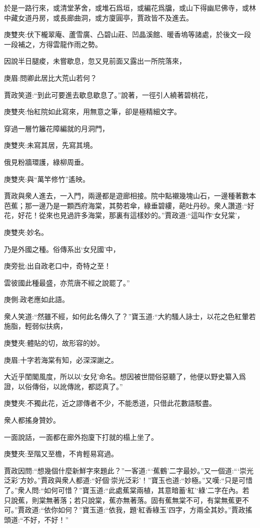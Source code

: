 \begin{parag}
    於是一路行來，或清堂茅舍，或堆石爲垣，或編花爲牖，或山下得幽尼佛寺，或林中藏女道丹房，或長廊曲洞，或方廈圓亭，賈政皆不及進去。\begin{note}庚雙夾:伏下櫳翠庵、蘆雪廣、凸碧山莊、凹晶溪館、暖香塢等諸處，於後文一段一段補之，方得雲龍作雨之勢。\end{note}因說半日腿痠，未嘗歇息，忽又見前面又露出一所院落來，\begin{note}庚眉:問卿此居比大荒山若何？\end{note}賈政笑道:“到此可要進去歇息歇息了。”說著，一徑引人繞著碧桃花，\begin{note}庚雙夾:怡紅院如此寫來，用無意之筆，卻是極精細文字。\end{note}穿過一層竹籬花障編就的月洞門，\begin{note}庚雙夾:未寫其居，先寫其境。\end{note}俄見粉牆環護，綠柳周垂。\begin{note}庚雙夾:與“萬竿修竹”遙映。\end{note}賈政與衆人進去，一入門，兩邊都是遊廊相接。院中點襯幾塊山石，一邊種著數本芭蕉；那一邊乃是一顆西府海棠，其勢若傘，綠垂碧縷，葩吐丹砂。衆人讚道:“好花，好花！從來也見過許多海棠，那裏有這樣妙的。”賈政道:“這叫作‘女兒棠’，\begin{note}庚雙夾:妙名。\end{note}乃是外國之種。俗傳系出‘女兒國’中，\begin{note}庚旁批:出自政老口中，奇特之至！\end{note}雲彼國此種最盛，亦荒唐不經之說罷了。”\begin{note}庚側:政老應如此語。\end{note}衆人笑道:“然雖不經，如何此名傳久了？”寶玉道:“大約騷人詠士，以花之色紅暈若施脂，輕弱似扶病，\begin{note}庚雙夾:體貼的切，故形容的妙。\end{note}\begin{note}庚眉:十字若海棠有知，必深深謝之。\end{note}大近乎閨閣風度，所以以‘女兒’命名。想因被世間俗惡聽了，他便以野史纂入爲證，以俗傳俗，以訛傳訛，都認真了。”\begin{note}庚雙夾:不獨此花，近之謬傳者不少，不能悉道，只借此花數語駁盡。\end{note}衆人都搖身贊妙。
\end{parag}


\begin{parag}
    一面說話，一面都在廊外抱廈下打就的榻上坐了。\begin{note}庚雙夾:至階又至檐，不肯輕易寫過。\end{note}賈政因問:“想幾個什麼新鮮字來題此？”一客道:“‘蕉鶴’二字最妙。”又一個道:“‘崇光泛彩’方妙。”賈政與衆人都道:“好個‘崇光泛彩’！”寶玉也道:“妙極。”又嘆:“只是可惜了。”衆人問:“如何可惜？”寶玉道:“此處蕉棠兩植，其意暗蓄‘紅’‘綠’二字在內。若只說蕉，則棠無著落；若只說棠，蕉亦無著落。固有蕉無棠不可，有棠無蕉更不可。”賈政道:“依你如何？”寶玉道:“依我，題‘紅香綠玉’四字，方兩全其妙。”賈政搖頭道:“不好，不好！”
\end{parag}



